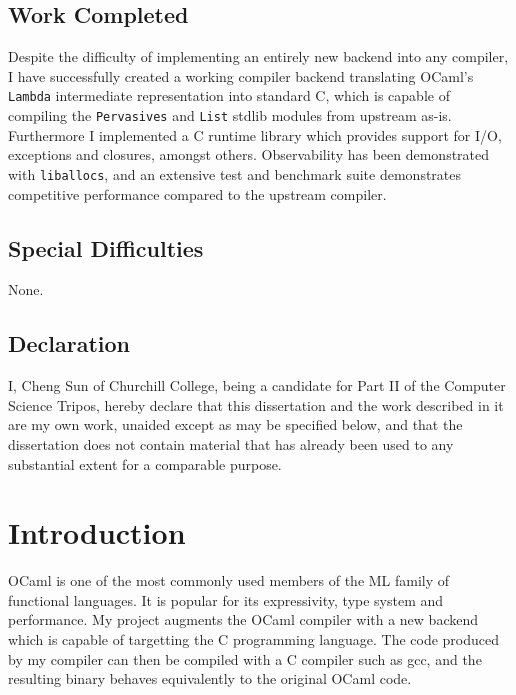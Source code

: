 \documentclass[12pt,a4paper,twoside,openright]{report}
\begin{document}
\section*{Work Completed}

Despite the difficulty of implementing an entirely new backend into any compiler,
I have successfully created a working compiler backend translating OCaml's
\lstinline!Lambda! intermediate representation into standard C, which is capable
of compiling the \lstinline!Pervasives! and \lstinline!List! stdlib modules from
upstream as-is. Furthermore I implemented a C runtime library which provides
support for I/O, exceptions and closures, amongst others. Observability has
been demonstrated with \lstinline!liballocs!, and an extensive test and
benchmark suite demonstrates competitive performance compared to the upstream
compiler.

\section*{Special Difficulties}

None.

\newpage
\section*{Declaration}

I, Cheng Sun of Churchill College, being a candidate for Part II of the Computer
Science Tripos, hereby declare
that this dissertation and the work described in it are my own work,
unaided except as may be specified below, and that the dissertation
does not contain material that has already been used to any substantial
extent for a comparable purpose.

\bigskip
{}

\medskip
{}

\tableofcontents

\newpage

\pagestyle{headings}

\chapter{Introduction}

OCaml is one of the most commonly used members of the ML family of functional
languages. It is popular for its expressivity, type system and performance.
My project augments the OCaml compiler with a new backend which is capable of
targetting the C programming language. The code produced by my compiler can
then be compiled with a C compiler such as gcc, and the resulting binary behaves
equivalently to the original OCaml code.
\end{document}
